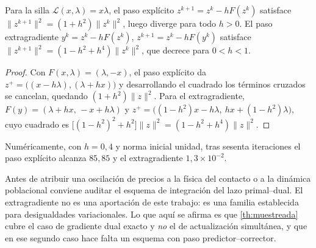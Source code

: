 \begin{proposicion}
\label{pr:euler-diverge}
Para la silla $\mathcal L(x,\lambda)=x\lambda$, el paso explícito
$z^{k+1}=z^k-hF(z^k)$ satisface $\|z^{k+1}\|^2=(1+h^2)\|z^k\|^2$, luego diverge
para todo $h>0$. El paso extragradiente
$y^k=z^k-hF(z^k)$, $z^{k+1}=z^k-hF(y^k)$ satisface
$\|z^{k+1}\|^2=(1-h^2+h^4)\|z^k\|^2$, que decrece para $0<h<1$.
\end{proposicion}

\begin{proof}
Con $F(x,\lambda)=(\lambda,-x)$, el paso explícito da
$z^{+}=\bigl((x-h\lambda),(\lambda+hx)\bigr)$ y desarrollando el cuadrado los
términos cruzados se cancelan, quedando $(1+h^2)\|z\|^2$. Para el
extragradiente, $F(y)=(\lambda+hx,\,-x+h\lambda)$ y
$z^{+}=\bigl((1-h^2)x-h\lambda,\ hx+(1-h^2)\lambda\bigr)$, cuyo cuadrado es
$\bigl[(1-h^2)^2+h^2\bigr]\|z\|^2=(1-h^2+h^4)\|z\|^2$.
\end{proof}

Numéricamente, con $h=0{,}4$ y norma inicial unidad, tras sesenta iteraciones el
paso explícito alcanza $85{,}85$ y el extragradiente $1{,}3\times10^{-2}$.

\begin{observacion}
\label{obs:extragradiente}
Antes de atribuir una oscilación de precios a la física del contacto o a la
dinámica poblacional conviene auditar el esquema de integración del lazo
primal--dual. El extragradiente no es una aportación de este trabajo: es una
familia establecida para desigualdades variacionales. Lo que aquí se afirma es
que \cref{th:muestreada} cubre el caso de gradiente dual exacto y \emph{no} el
de actualización simultánea, y que en ese segundo caso hace falta un esquema con
paso predictor--corrector.
\end{observacion}
